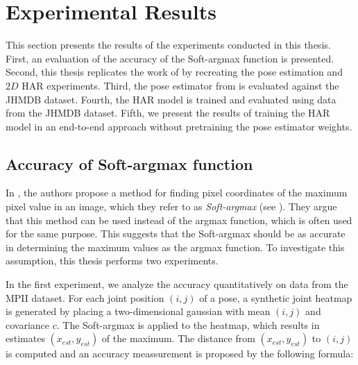 \section{Experimental Results}
This section presents the results of the experiments conducted in this thesis.
First, an evaluation of the accuracy of the Soft-argmax function is presented.
Second, this thesis replicates the work of \cite{luvizon_2d/3d_2018} by recreating the pose estimation and $2D$ HAR experiments.
Third, the pose estimator from \cite{luvizon_2d/3d_2018} is evaluated against the JHMDB dataset.
Fourth, the HAR model is trained and evaluated using data from the JHMDB dataset.
Fifth, we present the results of training the HAR model in an end-to-end approach without pretraining the pose estimator weights.
\label{sec:exp-results}

\subsection{Accuracy of Soft-argmax function}
\label{sec:exp-softargmax-accuracy}
In \cite{luvizon_human_2017}, the authors propose a method for finding pixel coordinates of the maximum pixel value in an image, which they refer to as \textit{Soft-argmax} (see ).
They argue that this method can be used instead of the argmax function, which is often used for the same purpose.
This suggests that the Soft-argmax should be as accurate in determining the maximum values as the argmax function.
To investigate this assumption, this thesis performs two experiments.

In the first experiment, we analyze the accuracy quantitatively on data from the MPII dataset.
For each joint position $(i,j)$ of a pose, a synthetic joint heatmap is generated by placing a two-dimensional gaussian with mean $(i,j)$ and covariance $c$.
The Soft-argmax is applied to the heatmap, which results in estimates $(x_{est},y_{est})$ of the maximum.
The distance from $(x_{est},y_{est})$ to $(i,j)$ is computed and an accuracy meassurement is proposed by the following formula:


